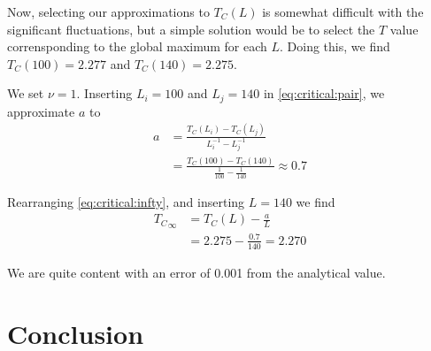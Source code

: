 \documentclass[a4paper]{article}
\begin{document}
Now, selecting our approximations to $T_C(L)$ is somewhat difficult with the significant fluctuations, but a simple solution would be to select the $T$ value corrensponding to the global maximum for each $L$. Doing this, we find $T_C(100) = 2.277$ and $T_C(140) = 2.275$.

We set $\nu=1$. Inserting $L_i = 100$ and $L_j = 140$ in \ref{eq:critical:pair}, we approximate $a$ to
\begin{align}
    a &= \frac{T_C(L_i) - T_C(L_j)}{L_i^{-1} - L_j^{-1}} \nonumber \\
     &= \frac{T_C(100) - T_C(140)}{\frac{1}{100} - \frac{1}{140}}
     \approx 0.7
\end{align}

Rearranging \ref{eq:critical:infty}, and inserting $L=140$ we find
\begin{align}
    {T_C}_\infty &= T_C(L) - \frac{a}{L} \nonumber \\
    &= 2.275 - \frac{0.7}{140}
    = 2.270
\end{align}

We are quite content with an error of 0.001 from the analytical value.

\section{Conclusion}\label{sec:conclusion}

%
%

{}
\end{document}
